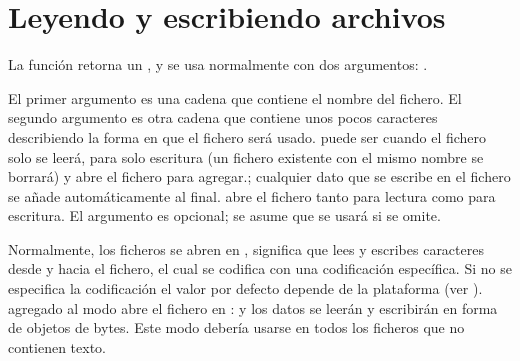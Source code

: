 \documentclass[a4,10pt,spanish]{sphinxmanual}
\begin{document}
\section{Leyendo y escribiendo archivos}
\label{\detokenize{tutorial/inputoutput:reading-and-writing-files}}\label{\detokenize{tutorial/inputoutput:tut-files}}
\ignorespaces 
\sphinxAtStartPar
La función  retorna un {\hyperref[\detokenize{glossary:term-file-object}]{}}, y se usa normalmente con dos argumentos: .

\begin{sphinxVerbatim}[commandchars=\\\{\}]
   
\end{sphinxVerbatim}

\sphinxAtStartPar
El primer argumento es una cadena que contiene el nombre del fichero. El segundo argumento es otra cadena que contiene unos pocos caracteres describiendo la forma en que el fichero será usado.  puede ser  cuando el fichero solo se leerá,  para solo escritura (un fichero existente con el mismo nombre se borrará) y  abre el fichero  para agregar.; cualquier dato que se escribe en el fichero se añade automáticamente al final.   abre el fichero tanto para lectura como para escritura. El argumento  es opcional; se asume que se usará  si se omite.

\sphinxAtStartPar
Normalmente, los ficheros se abren en , significa que lees y escribes caracteres desde y hacia el fichero, el cual se codifica con una codificación específica. Si no se especifica la codificación el valor por defecto depende de la plataforma (ver ).  agregado al modo abre el fichero en  : y los datos se leerán y escribirán en forma de objetos de bytes. Este modo debería usarse en todos los ficheros que no contienen texto.
\end{document}
